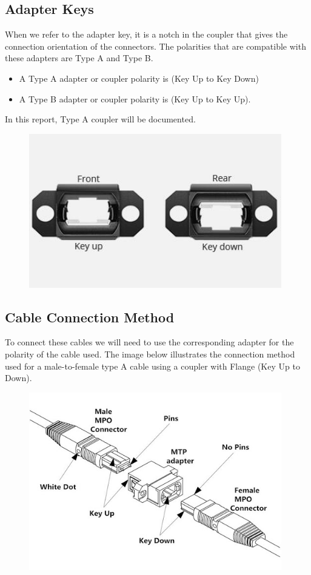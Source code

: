 \newpage
  \subsection{Adapter Keys}
  When we refer to the adapter key, it is a notch in the coupler that gives the connection orientation of the connectors. The polarities that are compatible with these adapters are Type A and Type B.
  \begin{itemize}
    \item A Type A adapter or coupler polarity is (Key Up to Key Down)
    \item A Type B adapter or coupler polarity is  (Key Up to Key Up).
  \end{itemize}
  In this report, Type A coupler will be documented.
  \begin{figure}
    \includegraphics[width=11cm]{images/8.jpg}
    \centering
  \end{figure}

\newpage
  \subsection{Cable Connection Method}
  To connect these cables we will need to use the corresponding adapter for the polarity of the cable used. The image below illustrates the connection method used for a male-to-female type A cable using a coupler with Flange (Key Up to Down).
  \begin{figure}
    \includegraphics[width=11cm]{images/9.jpg}
    \centering
  \end{figure}

